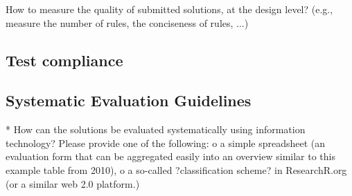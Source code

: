           How to measure the quality of submitted solutions, at the design level?
            (e.g., measure the number of rules, the conciseness of rules, ...)

\subsection{Test compliance}


\subsection{Systematic Evaluation Guidelines}
    * How can the solutions be evaluated systematically using information technology?
      Please provide one of the following:
          o a simple spreadsheet (an evaluation form that can be aggregated easily into an overview similar to this example table from 2010),
          o a so-called ?classification scheme? in ResearchR.org (or a similar web 2.0 platform.)
